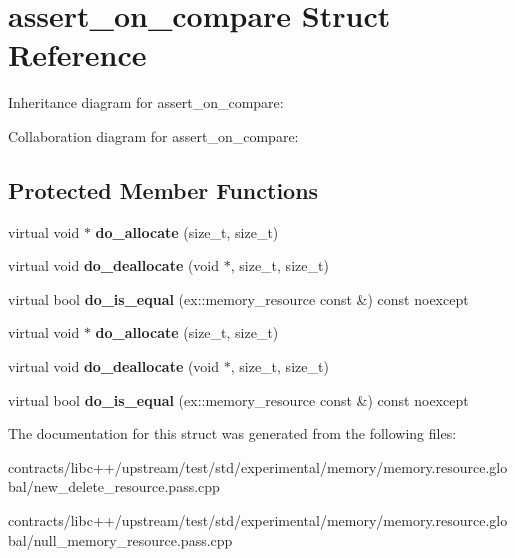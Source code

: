 \hypertarget{structassert__on__compare}{}\section{assert\+\_\+on\+\_\+compare Struct Reference}
\label{structassert__on__compare}


Inheritance diagram for assert\+\_\+on\+\_\+compare\+:


Collaboration diagram for assert\+\_\+on\+\_\+compare\+:
\subsection*{Protected Member Functions}
\begin{DoxyCompactItemize}
\item 
\mbox{\label{structassert__on__compare_a222125c0131f1062abd44be6b732cafd}} 
virtual void $\ast$ {\bfseries do\+\_\+allocate} (size\+\_\+t, size\+\_\+t)
\item 
\mbox{\label{structassert__on__compare_a5aed3e9779905f2debac620f61d742ef}} 
virtual void {\bfseries do\+\_\+deallocate} (void $\ast$, size\+\_\+t, size\+\_\+t)
\item 
\mbox{\label{structassert__on__compare_ae4fa84041876931641f7aa1f422e7c74}} 
virtual bool {\bfseries do\+\_\+is\+\_\+equal} (ex\+::memory\+\_\+resource const \&) const noexcept
\item 
\mbox{\label{structassert__on__compare_a222125c0131f1062abd44be6b732cafd}} 
virtual void $\ast$ {\bfseries do\+\_\+allocate} (size\+\_\+t, size\+\_\+t)
\item 
\mbox{\label{structassert__on__compare_a5aed3e9779905f2debac620f61d742ef}} 
virtual void {\bfseries do\+\_\+deallocate} (void $\ast$, size\+\_\+t, size\+\_\+t)
\item 
\mbox{\label{structassert__on__compare_ae4fa84041876931641f7aa1f422e7c74}} 
virtual bool {\bfseries do\+\_\+is\+\_\+equal} (ex\+::memory\+\_\+resource const \&) const noexcept
\end{DoxyCompactItemize}


The documentation for this struct was generated from the following files\+:\begin{DoxyCompactItemize}
\item 
contracts/libc++/upstream/test/std/experimental/memory/memory.\+resource.\+global/new\+\_\+delete\+\_\+resource.\+pass.\+cpp\item 
contracts/libc++/upstream/test/std/experimental/memory/memory.\+resource.\+global/null\+\_\+memory\+\_\+resource.\+pass.\+cpp\end{DoxyCompactItemize}
